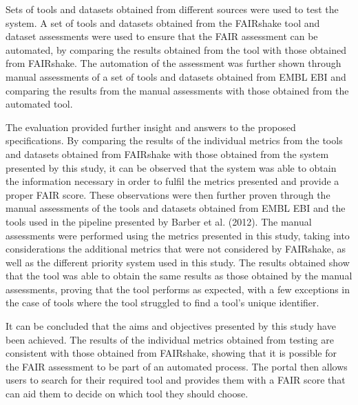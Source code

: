 \documentclass{cisfyp}
\begin{document}
Sets of tools and datasets obtained from different sources were used to test the system. A set of tools and datasets obtained from the FAIRshake tool and dataset assessments were used to ensure that the FAIR assessment can be automated, by comparing the results obtained from the tool with those obtained from FAIRshake. The automation of the assessment was further shown through manual assessments of a set of tools and datasets obtained from EMBL EBI \cite{ebi} and comparing the results from the manual assessments with those obtained from the automated tool. 

The evaluation provided further insight and answers to the proposed specifications. By comparing the results of the individual metrics from the tools and datasets obtained from FAIRshake with those obtained from the system presented by this study, it can be observed that the system was able to obtain the information necessary in order to fulfil the metrics presented and provide a proper FAIR score. These observations were then further proven through the manual assessments of the tools and datasets obtained from EMBL EBI \cite{ebi} and the tools used in the pipeline presented by Barber et al. (2012). The manual assessments were performed using the metrics presented in this study, taking into considerations the additional metrics that were not considered by FAIRshake, as well as the different priority system used in this study. The results obtained show that the tool was able to obtain the same results as those obtained by the manual assessments, proving that the tool performs as expected, with a few exceptions in the case of tools where the tool struggled to find a tool's unique identifier.

It can be concluded that the aims and objectives presented by this study have been achieved. The results of the individual metrics obtained from testing are consistent with those obtained from FAIRshake, showing that it is possible for the FAIR assessment to be part of an automated process. The portal then allows users to search for their required tool and provides them with a FAIR score that can aid them to decide on which tool they should choose.
\end{document}

